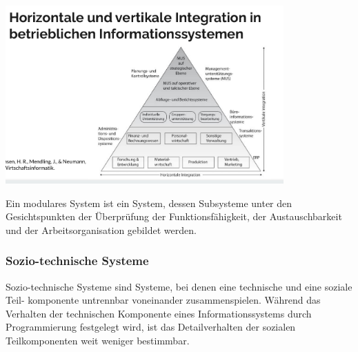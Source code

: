 \includegraphics[width=0.8\textwidth]{assets/HoriVertIntegration.PNG}
\par
Ein modulares System ist ein System, dessen Subsysteme unter den Gesichtspunkten der Überprüfung der Funktionsfähigkeit, der Austauschbarkeit und der Arbeitsorganisation gebildet werden.

\subsubsection{Sozio-technische Systeme}
\par
Sozio-technische Systeme sind Systeme, bei denen eine technische und eine soziale Teil- komponente untrennbar voneinander zusammenspielen. Während das Verhalten der technischen Komponente eines Informationssystems durch Programmierung festgelegt wird, ist das Detailverhalten der sozialen Teilkomponenten weit weniger bestimmbar.

\clearpage
